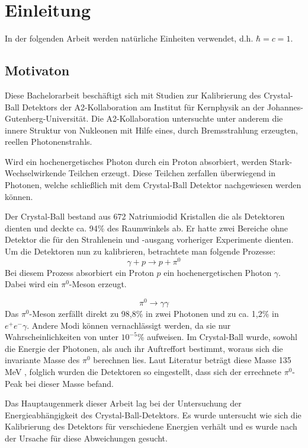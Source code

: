 \documentclass[a4paper,11pt,oneside,final,german,openbib,pdftex]{scrbook}
\begin{document}
\chapter{Einleitung}
In der folgenden Arbeit werden natürliche Einheiten verwendet, d.h. $\hbar=c=1$.
\section{Motivaton}
{
	Diese Bachelorarbeit beschäftigt sich mit Studien zur Kalibrierung des Crystal-Ball Detektors der A2-Kollaboration am Institut für Kernphysik an der Johannes-Gutenberg-Universität.
	Die A2-Kollaboration untersuchte unter anderem die innere Struktur von Nukleonen mit Hilfe eines, durch Bremsstrahlung erzeugten, reellen Photonenstrahls. 
	
	Wird ein hochenergetisches Photon durch ein Proton absorbiert, werden Stark-Wechselwirkende Teilchen erzeugt. Diese Teilchen zerfallen überwiegend in Photonen, welche schließlich mit dem Crystal-Ball Detektor nachgewiesen werden können. 
	
	Der Crystal-Ball bestand aus 672 Natriumiodid Kristallen die als Detektoren dienten und deckte ca. 94\% des Raumwinkels ab.
	Er hatte zwei Bereiche ohne Detektor die für den Strahlenein und -ausgang vorheriger Experimente dienten.
	Um die Detektoren nun zu kalibrieren, betrachtete man folgende Prozesse:
\begin{equation}
	\gamma + p \rightarrow p + \pi^0
	\label{eq.gammascattering}
\end{equation} 
Bei diesem Prozess absorbiert ein Proton $p$ ein hochenergetischen Photon $\gamma$. Dabei wird ein $\pi^0$-Meson erzeugt.

	\begin{equation}
		\pi^0\rightarrow \gamma \gamma
		\label{eq.pi0decay}
	\end{equation}
Das $\pi^0$-Meson zerfällt direkt zu 98,8\% in zwei Photonen und zu ca. 1,2\% in $e^+e^- \gamma$. Andere Modi können vernachlässigt werden, da sie nur Wahrscheinlichkeiten von unter $10^{-5}$\% aufweisen. Im Crystal-Ball wurde, sowohl die Energie der Photonen, als auch ihr Auftreffort bestimmt, woraus sich die invariante Masse des $\pi^0$ berechnen lies.
Laut Literatur betr\"agt diese Masse 135 MeV \cite{PDG16}, folglich wurden die Detektoren so eingestellt, dass sich der errechnete $\pi^0$-Peak bei dieser Masse befand. 

Das Hauptaugenmerk dieser Arbeit lag bei der Untersuchung der Energieabh\"angigkeit des Crystal-Ball-Detektors. Es wurde untersucht wie sich die Kalibrierung des Detektors f\"ur verschiedene Energien verh\"alt und es wurde nach der Ursache f\"ur diese Abweichungen gesucht. 
\newline	 
	
}
\end{document}
